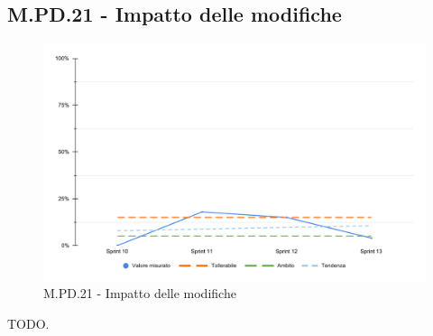 \subsection{M.PD.21 - Impatto delle modifiche}

\begin{figure}[H]
  \centering
  \includegraphics[width=\textwidth]{assets/impatto_modifiche.pdf}
  \caption{M.PD.21 - Impatto delle modifiche}
\end{figure}

\par TODO.